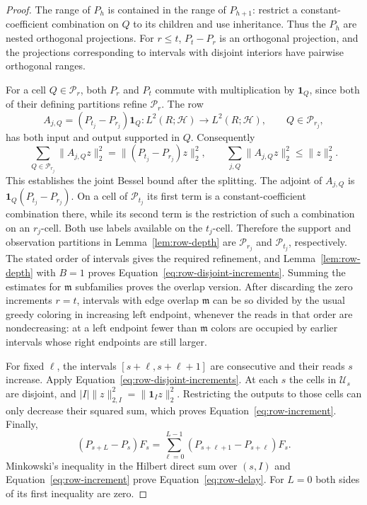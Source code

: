 \begin{proof}
The range of $P_h$ is contained in the range of $P_{h+1}$:
restrict a constant-coefficient combination on $Q$ to its
children and use inheritance.  Thus the $P_h$ are nested
orthogonal projections.  For $r\le t$, $P_t-P_r$ is an
orthogonal projection, and the projections corresponding to
intervals with disjoint interiors have pairwise orthogonal ranges.

For a cell $Q\in\mathcal P_r$, both $P_r$ and $P_t$ commute with
multiplication by $\mathbf1_Q$, since both of their defining
partitions refine $\mathcal P_r$.  The row
\[
 A_{j,Q}=(P_{t_j}-P_{r_j})\mathbf1_Q:
        L^2(R;\mathcal H)\longrightarrow L^2(R;\mathcal H),
 \qquad Q\in\mathcal P_{r_j},
\]
has both input and output supported in $Q$.  Consequently
\[
 \sum_{Q\in\mathcal P_{r_j}}\|A_{j,Q}z\|_2^2
 =\|(P_{t_j}-P_{r_j})z\|_2^2,
 \qquad
 \sum_{j,Q}\|A_{j,Q}z\|_2^2\le\|z\|_2^2.
\]
This establishes the joint Bessel bound after the splitting.
The adjoint of $A_{j,Q}$ is
$\mathbf1_Q(P_{t_j}-P_{r_j})$.  On a cell of
$\mathcal P_{t_j}$ its first term is a constant-coefficient
combination there, while its second term is the restriction of
such a combination on an $r_j$-cell.  Both use labels available
on the $t_j$-cell.  Therefore the support and observation
partitions in Lemma~\ref{lem:row-depth} are
$\mathcal P_{r_j}$ and $\mathcal P_{t_j}$, respectively.
The stated order of intervals gives the required refinement,
and Lemma~\ref{lem:row-depth} with $B=1$ proves
Equation~\eqref{eq:row-disjoint-increments}.  Summing the
estimates for $\mathfrak m$ subfamilies proves the overlap version.
After discarding the zero increments $r=t$, intervals with edge overlap
$\mathfrak m$ can be so divided by the usual greedy coloring in increasing left
endpoint, whenever the reads in that order are nondecreasing:
at a left endpoint fewer than $\mathfrak m$ colors are occupied
by earlier intervals whose right endpoints are still larger.

For fixed $\ell$, the intervals $[s+\ell,s+\ell+1]$ are
consecutive and their reads $s$ increase.  Apply
Equation~\eqref{eq:row-disjoint-increments}.  At each $s$ the
cells in $\mathcal U_s$ are disjoint, and
$|I|\|z\|_{2,I}^2=\|\mathbf1_Iz\|_2^2$.  Restricting the
outputs to those cells can only decrease their squared sum,
which proves Equation~\eqref{eq:row-increment}.  Finally,
\[
 (P_{s+L}-P_s)F_s
 =\sum_{\ell=0}^{L-1}(P_{s+\ell+1}-P_{s+\ell})F_s.
\]
Minkowski's inequality in the Hilbert direct sum over $(s,I)$
and Equation~\eqref{eq:row-increment} prove
Equation~\eqref{eq:row-delay}.  For $L=0$ both sides of its
first inequality are zero.
\end{proof}

